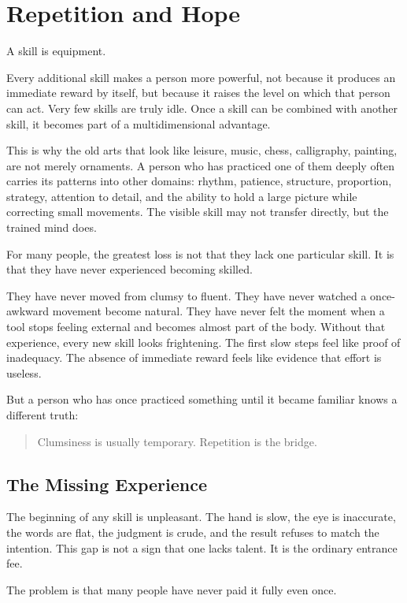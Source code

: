 \chapter{Repetition and Hope}

A skill is equipment.

Every additional skill makes a person more powerful, not because it produces an immediate reward by itself, but because it raises the level on which that person can act. Very few skills are truly idle. Once a skill can be combined with another skill, it becomes part of a multidimensional advantage.

This is why the old arts that look like leisure, music, chess, calligraphy, painting, are not merely ornaments. A person who has practiced one of them deeply often carries its patterns into other domains: rhythm, patience, structure, proportion, strategy, attention to detail, and the ability to hold a large picture while correcting small movements. The visible skill may not transfer directly, but the trained mind does.

For many people, the greatest loss is not that they lack one particular skill. It is that they have never experienced becoming skilled.

They have never moved from clumsy to fluent. They have never watched a once-awkward movement become natural. They have never felt the moment when a tool stops feeling external and becomes almost part of the body. Without that experience, every new skill looks frightening. The first slow steps feel like proof of inadequacy. The absence of immediate reward feels like evidence that effort is useless.

But a person who has once practiced something until it became familiar knows a different truth:

\begin{quote}
Clumsiness is usually temporary. Repetition is the bridge.
\end{quote}

\section*{The Missing Experience}

The beginning of any skill is unpleasant. The hand is slow, the eye is inaccurate, the words are flat, the judgment is crude, and the result refuses to match the intention. This gap is not a sign that one lacks talent. It is the ordinary entrance fee.

The problem is that many people have never paid it fully even once.

